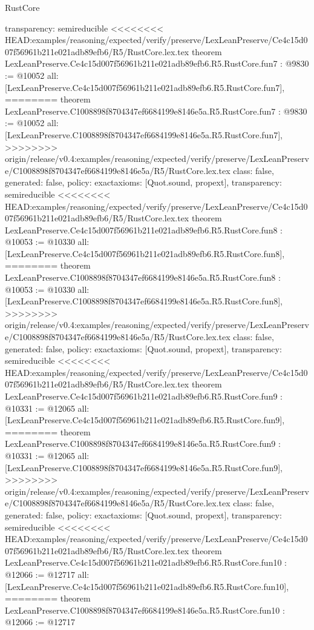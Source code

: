 \begin{lexlean}{RustCore}
\begin{coremodule}
{\begin{coremodule}
{{{{{{{{{{  transparency: semireducible
}
<<<<<<<< HEAD:examples/reasoning/expected/verify/preserve/LexLeanPreserve/Ce4c15d007f56961b211e021adb89efb6/R5/RustCore.lex.tex
theorem LexLeanPreserve.Ce4c15d007f56961b211e021adb89efb6.R5.RustCore.fun7 : @9830 := @10052 {
  all: [LexLeanPreserve.Ce4c15d007f56961b211e021adb89efb6.R5.RustCore.fun7],
========
theorem LexLeanPreserve.C1008898f8704347ef6684199e8146e5a.R5.RustCore.fun7 : @9830 := @10052 {
  all: [LexLeanPreserve.C1008898f8704347ef6684199e8146e5a.R5.RustCore.fun7],
>>>>>>>> origin/release/v0.4:examples/reasoning/expected/verify/preserve/LexLeanPreserve/C1008898f8704347ef6684199e8146e5a/R5/RustCore.lex.tex
  class: false,
  generated: false,
  policy: exact{axioms: [Quot.sound, propext]},
  transparency: semireducible
}
<<<<<<<< HEAD:examples/reasoning/expected/verify/preserve/LexLeanPreserve/Ce4c15d007f56961b211e021adb89efb6/R5/RustCore.lex.tex
theorem LexLeanPreserve.Ce4c15d007f56961b211e021adb89efb6.R5.RustCore.fun8 : @10053 := @10330 {
  all: [LexLeanPreserve.Ce4c15d007f56961b211e021adb89efb6.R5.RustCore.fun8],
========
theorem LexLeanPreserve.C1008898f8704347ef6684199e8146e5a.R5.RustCore.fun8 : @10053 := @10330 {
  all: [LexLeanPreserve.C1008898f8704347ef6684199e8146e5a.R5.RustCore.fun8],
>>>>>>>> origin/release/v0.4:examples/reasoning/expected/verify/preserve/LexLeanPreserve/C1008898f8704347ef6684199e8146e5a/R5/RustCore.lex.tex
  class: false,
  generated: false,
  policy: exact{axioms: [Quot.sound, propext]},
  transparency: semireducible
}
<<<<<<<< HEAD:examples/reasoning/expected/verify/preserve/LexLeanPreserve/Ce4c15d007f56961b211e021adb89efb6/R5/RustCore.lex.tex
theorem LexLeanPreserve.Ce4c15d007f56961b211e021adb89efb6.R5.RustCore.fun9 : @10331 := @12065 {
  all: [LexLeanPreserve.Ce4c15d007f56961b211e021adb89efb6.R5.RustCore.fun9],
========
theorem LexLeanPreserve.C1008898f8704347ef6684199e8146e5a.R5.RustCore.fun9 : @10331 := @12065 {
  all: [LexLeanPreserve.C1008898f8704347ef6684199e8146e5a.R5.RustCore.fun9],
>>>>>>>> origin/release/v0.4:examples/reasoning/expected/verify/preserve/LexLeanPreserve/C1008898f8704347ef6684199e8146e5a/R5/RustCore.lex.tex
  class: false,
  generated: false,
  policy: exact{axioms: [Quot.sound, propext]},
  transparency: semireducible
}
<<<<<<<< HEAD:examples/reasoning/expected/verify/preserve/LexLeanPreserve/Ce4c15d007f56961b211e021adb89efb6/R5/RustCore.lex.tex
theorem LexLeanPreserve.Ce4c15d007f56961b211e021adb89efb6.R5.RustCore.fun10 : @12066 := @12717 {
  all: [LexLeanPreserve.Ce4c15d007f56961b211e021adb89efb6.R5.RustCore.fun10],
========
theorem LexLeanPreserve.C1008898f8704347ef6684199e8146e5a.R5.RustCore.fun10 : @12066 := @12717 {
}}}}}}}}}}}}}}
\end{coremodule}}
\end{coremodule}
\end{lexlean}
